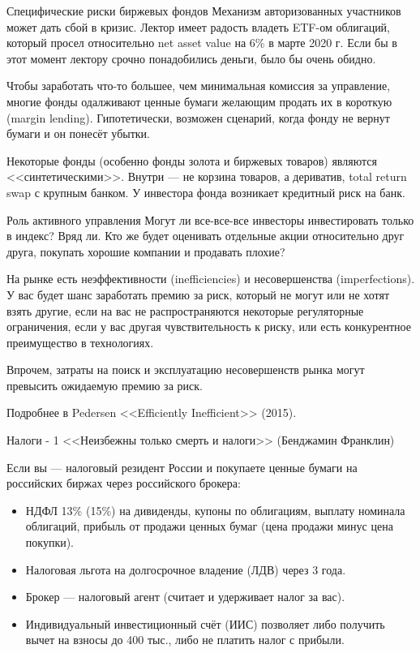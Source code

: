 \documentclass{beamer}
\begin{document}
\begin{frame}{Специфические риски биржевых фондов}
\justify
Механизм авторизованных участников может дать сбой в кризис. Лектор имеет радость владеть ETF-ом облигаций, который просел относительно net asset value на 6\% в марте 2020 г. Если бы в этот момент лектору срочно понадобились деньги, было бы очень обидно.

\justify
Чтобы заработать что-то большее, чем минимальная комиссия за управление, многие фонды одалживают ценные бумаги желающим продать их в короткую (margin lending). Гипотетически, возможен сценарий, когда фонду не вернут бумаги и он понесёт убытки.

\justify
Некоторые фонды (особенно фонды золота и биржевых товаров) являются <<синтетическими>>. Внутри --- не корзина товаров, а дериватив, total return swap с крупным банком. У инвестора фонда возникает кредитный риск на банк.
\end{frame}



\begin{frame}{Роль активного управления}
\justify
Могут ли все-все-все инвесторы инвестировать только в индекс? Вряд ли. Кто же будет оценивать отдельные акции относительно друг друга, покупать хорошие компании и продавать плохие?

\justify
На рынке есть неэффективности (inefficiencies) и несовершенства (imperfections). У вас будет шанс заработать премию за риск, который не могут или не хотят взять другие, если на вас не распространяются некоторые регуляторные ограничения, если у вас другая чувствительность к риску, или есть конкурентное преимущество в технологиях.

\justify
Впрочем, затраты на поиск и эксплуатацию несовершенств рынка могут превысить ожидаемую премию за риск.

\justify
Подробнее в Pedersen <<Efficiently Inefficient>> (2015).
\end{frame}



\begin{frame}{Налоги - 1}
\justify
<<Неизбежны только смерть и налоги>> (Бенджамин Франклин)

\justify
Если вы --- налоговый резидент России и покупаете ценные бумаги на российских биржах через российского брокера:
\begin{itemize}
\justifying
\item НДФЛ 13\% (15\%) на дивиденды, купоны по облигациям, выплату номинала облигаций, прибыль от продажи ценных бумаг (цена продажи минус цена покупки).
\item Налоговая льгота на долгосрочное владение (ЛДВ) через 3 года.
\item Брокер --- налоговый агент (считает и удерживает налог за вас).
\item Индивидуальный инвестиционный счёт (ИИС) позволяет либо получить вычет на взносы до 400 тыс., либо не платить налог с прибыли.
\end{itemize}
\end{frame}
\end{document}
